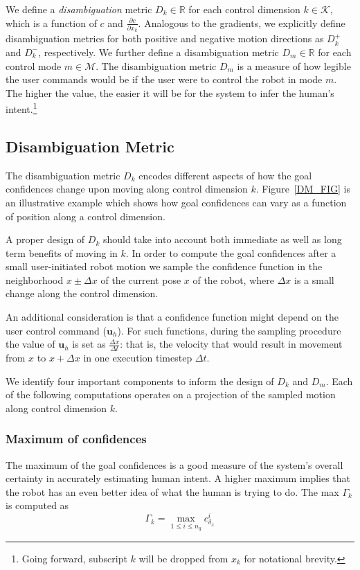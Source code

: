 \documentclass[conference]{IEEEtran}
\begin{document}
We define a \textit{disambiguation} metric $D_{k}\in \mathbb{R}$ for each control dimension $k \in \mathcal{K}$, which is a function of $c$ and $\frac{\partial c}{\partial x_k}$. Analogous to the gradients, we explicitly define disambiguation metrics for both positive and negative motion directions as $D_{k}^{+}$ and $D_{k}^{-}$, respectively.
We further define a disambiguation metric $D_m \in \mathbb{R}$ for each control mode $m \in \mathcal{M}$.
The disambiguation metric $D_m$ is a measure of how legible the user commands would be if the user were to control the robot in mode $m$. The higher the value, the easier it will be for the system to infer the human's intent.\footnote{Going forward, subscript $k$ will be dropped from $x_k$ for notational brevity.} 

\subsection{Disambiguation Metric}\label{DM}

The disambiguation metric $D_{k}$ encodes different aspects of how the goal confidences change upon moving along control dimension $k$. Figure~\ref{DM_FIG} is an illustrative example which shows how goal confidences can vary as a function of position along a control dimension. 

A proper design of $D_{k}$ should take into account both immediate as well as long term benefits of moving in $k$. In order to compute the goal confidences after a small user-initiated robot motion we sample the confidence function in the neighborhood $x\pm\Delta x$ of the current pose $x$ of the robot, where $\Delta x$ is a small change along the control dimension. 
	
An additional consideration is that a confidence function might depend on the user control command ($\boldsymbol{u}_h$). For such functions, during the sampling procedure the value of $\boldsymbol{u}_h$ is set as $\frac{\Delta x}{\Delta t}$: that is, the velocity that would result in movement from $x$ to $x + \Delta x$ in one execution timestep $\Delta t$. 

We identify four important components to inform the design of $D_{k}$ and $D_m$.
Each of the following computations operates on a projection of the sampled motion along control dimension $k$.


 
\subsubsection{Maximum of confidences}
The maximum of the goal confidences is a good measure of the system's overall certainty in accurately estimating human intent. A higher maximum implies that the robot has an even better idea of what the human is trying to do. The max $\Gamma_k$ is computed as
\begin{equation*}
\Gamma_k =\max\limits_{1 \leq i \leq n_g}c^{i}_{\delta_x}
\end{equation*}
\end{document}
